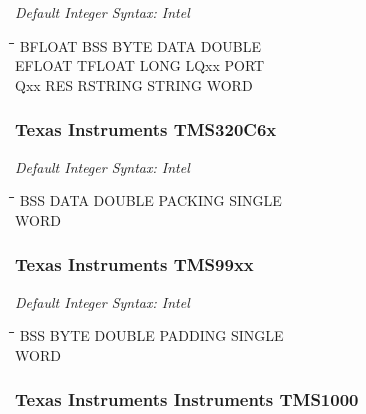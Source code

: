 {\em Default Integer Syntax: Intel}

{\tt\begin{tabbing}
\hspace{3cm}\=\hspace{3cm}\=\hspace{3cm}\=\hspace{3cm}\=\kill
BFLOAT     \> BSS         \> BYTE        \> DATA        \> DOUBLE \\
EFLOAT     \> TFLOAT      \> LONG        \> LQxx        \> PORT \\
Qxx        \> RES         \> RSTRING     \> STRING      \> WORD \\
\end{tabbing}}

\subsubsection{Texas Instruments TMS320C6x}

{\em Default Integer Syntax: Intel}

{\tt\begin{tabbing}
\hspace{3cm}\=\hspace{3cm}\=\hspace{3cm}\=\hspace{3cm}\=\kill
BSS         \> DATA        \> DOUBLE     \> PACKING     \> SINGLE \\
WORD \\
\end{tabbing}}

\subsubsection{Texas Instruments TMS99xx}

{\em Default Integer Syntax: Intel}

{\tt\begin{tabbing}
\hspace{3cm}\=\hspace{3cm}\=\hspace{3cm}\=\hspace{3cm}\=\kill
BSS        \> BYTE        \> DOUBLE      \> PADDING     \> SINGLE \\
WORD \\
\end{tabbing}}

\subsubsection{Texas Instruments Instruments TMS1000}

